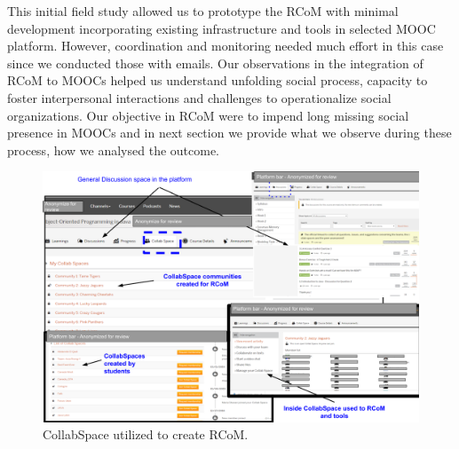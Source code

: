 \documentclass[format=acmsmall, review=false, screen=true]{acmart}
\begin{document}
This initial field study allowed us to prototype the RCoM with minimal development incorporating existing infrastructure and tools in selected MOOC platform. However, coordination and monitoring needed much effort in this case since we conducted those with emails. Our observations in the integration of RCoM to MOOCs helped us understand unfolding social process, capacity to foster interpersonal interactions and challenges to operationalize social organizations. Our objective in RCoM were to impend long missing social presence in MOOCs and in next section we provide what we observe during these process, how we analysed the outcome. 

\begin{figure}[h]
 \centering
 \includegraphics[width=\linewidth]{images/CollabSpacedetails.png}
 \caption{CollabSpace utilized to create RCoM.}
 \label{fig:CollabSpace}
\end{figure}
\end{document}
